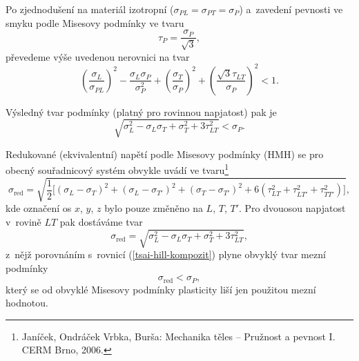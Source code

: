 Po zjednodušení na materiál izotropní ($\sigma_{PL}= \sigma_{PT} = \sigma_P$) a~zavedení pevnosti ve smyku podle Misesovy podmínky ve tvaru
\begin{equation}
	\tau_P = \frac{\sigma_P}{\sqrt{3}},
\end{equation}
převedeme výše uvedenou nerovnici na tvar
\begin{equation}
	\left(\frac{\sigma_L}{\sigma_{PL}}\right)^2
	- \frac{\sigma_L \sigma_P}{\sigma_P^2}
	+ \left(\frac{\sigma_T}{\sigma_P}\right)^2
	+ \left(\frac{\sqrt{3} \tau_{LT}}{\sigma_P}\right)^2 < 1.
\end{equation}

Výsledný tvar podmínky (platný pro rovinnou napjatost) pak je
\begin{equation}\label{tsai-hill-kompozit}
	\sqrt{\sigma_L^2 - \sigma_L\sigma_T + \sigma_T^2 + 3\tau_{LT}^2} < \sigma_P.
\end{equation}

Redukované (ekvivalentní) napětí podle Misesovy podmínky (HMH) se pro obecný souřadnicový systém obvykle uvádí ve tvaru\footnote{Janíček, Ondráček Vrbka, Burša: Mechanika těles -- Pružnost a pevnost I. CERM Brno, 2006.}
\begin{equation}
	\sigma_\text{red}
	= \sqrt{\frac{1}{2} \bigg[ (\sigma_L-\sigma_T)^2 + (\sigma_L-\sigma_{T'})^2 + (\sigma_T-\sigma_{T'})^2 + 6 \left( \tau_{LT}^2 + \tau_{LT'}^2 + \tau_{TT'}^2 \right) \bigg]},
\end{equation}
kde označení os $x$, $y$, $z$ bylo pouze změněno na $L$, $T$, $T'$.
Pro dvouosou napjatost v~rovině $LT$ pak dostáváme tvar
\begin{equation}
	\sigma_\text{red} = \sqrt{\sigma_L^2 - \sigma_L\sigma_T + \sigma_T^2 + 3\tau_{LT}^2},
\end{equation}
z~nějž porovnáním s~rovnicí (\ref{tsai-hill-kompozit}) plyne obvyklý tvar mezní podmínky
\begin{equation}
	\sigma_\text{red} < \sigma_P,
\end{equation}
který se od obvyklé Misesovy podmínky plasticity liší jen použitou mezní hodnotou.
